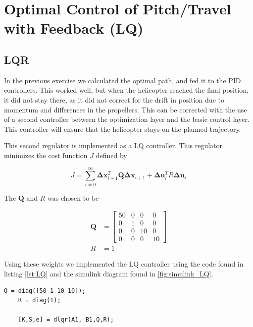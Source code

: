 
\section{Optimal Control of Pitch/Travel with Feedback (LQ)}
\subsection{LQR}
In the previous exercise we calculated the optimal path, and fed it to the PID controllers. This worked well, but when the helicopter reached the final position, it did not stay there, as it did not correct for the drift in position due to momentum and differences in the propellers. This can be corrected with the use of a second controller between the optimization layer and the basic control layer. This controller will ensure that the helicopter stays on the planned trajectory.

This second regulator is implemented as a LQ controller. This regulator minimizes the cost function $J$ defined by

\begin{equation}
    J = \sum^{\infty}_{i=0} \mathbf{\Delta} \mathbf{x}^T_{i+1}\mathbf{Q}\mathbf{\Delta} \mathbf{x}_{i+1}+\mathbf{\Delta} \mathbf{u}_i^T R \mathbf{\Delta} \mathbf{u}_i
\end{equation}

The $\mathbf{Q}$ and $R$ was chosen to be

\begin{subequations}
    \begin{align}
        \mathbf{Q} &= \begin{bmatrix}
            50 & 0 & 0 & 0\\
            0 & 1 & 0 & 0 \\
            0 & 0 & 10 & 0\\
            0 & 0 & 0 & 10
        \end{bmatrix}\\
        R &= 1
    \end{align}
\end{subequations}

Using these weights we implemented the LQ controller using the code found in listing \ref{lst:LQ} and the simulink diagram found in \cref{fig:simulink_LQ}.

\begin{lstlisting}[caption={MatLab code for LQ controller},label=lst:LQ]
    Q = diag([50 1 10 10]);
    R = diag(1);

    [K,S,e] = dlqr(A1, B1,Q,R);
\end{lstlisting}


